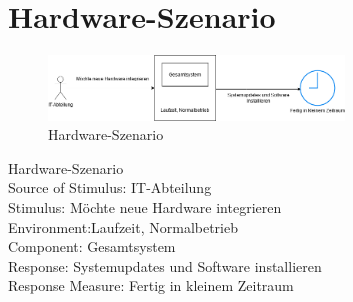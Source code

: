 \section{Hardware-Szenario}
\begin{figure}[tbh]
  \centering
  \includegraphics[width=0.7\textwidth]{Graphics/Hardware.png}
  \caption{Hardware-Szenario}
  \label{fig:Qualitaet6}
\end{figure}


Hardware-Szenario\\
Source of Stimulus: IT-Abteilung\\
Stimulus: Möchte neue Hardware integrieren\\
Environment:Laufzeit, Normalbetrieb\\
Component: Gesamtsystem\\
Response: Systemupdates und Software installieren\\
Response Measure: Fertig in kleinem Zeitraum\\

